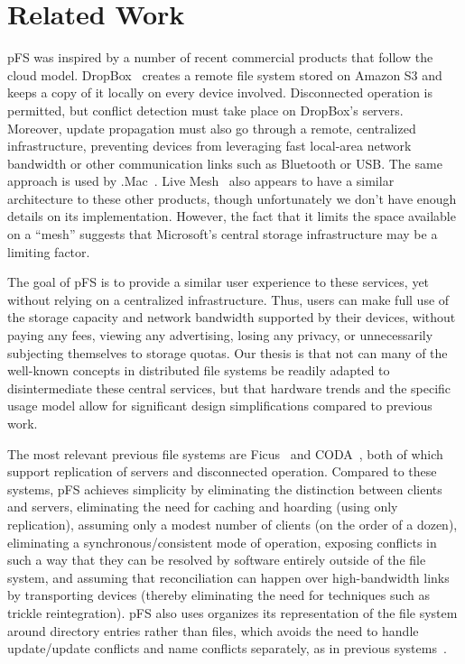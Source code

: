 
\section{Related Work}
\label{s:related}


pFS was inspired by a number of recent commercial products that follow
the cloud model.  DropBox~\cite{houston:dropbox} creates a remote file
system stored on Amazon S3 and keeps a copy of it locally on every
device involved.  Disconnected operation is permitted, but conflict
detection must take place on DropBox's servers.  Moreover, update
propagation must also go through a remote, centralized infrastructure,
preventing devices from leveraging fast local-area network bandwidth
or other communication links such as Bluetooth or USB\@.  The same
approach is used by .Mac~\cite{apple:mac}.  Live
Mesh~\cite{microsoft:livemesh} also appears to have a similar
architecture to these other products, though unfortunately we don't
have enough details on its implementation.  However, the fact that it
limits the space available on a ``mesh'' suggests that Microsoft's
central storage infrastructure may be a limiting factor.

The goal of pFS is to provide a similar user experience to these
services, yet without relying on a centralized infrastructure.  Thus,
users can make full use of the storage capacity and network bandwidth
supported by their devices, without paying any fees, viewing any
advertising, losing any privacy, or unnecessarily subjecting
themselves to storage quotas.  Our thesis is that not can many of the
well-known concepts in distributed file systems be readily adapted to
disintermediate these central services, but that hardware trends and
the specific usage model allow for significant design simplifications
compared to previous work.

The most relevant previous file systems are Ficus~\cite{page:ficus}
and CODA~\cite{kistler:coda}, both of which support replication of
servers and disconnected operation.  Compared to these systems, pFS
achieves simplicity by eliminating the distinction between clients and
servers, eliminating the need for caching and hoarding (using only
replication), assuming only a modest number of clients (on the order
of a dozen), eliminating a synchronous/consistent mode of operation,
exposing conflicts in such a way that they can be resolved by software
entirely outside of the file system, and assuming that reconciliation
can happen over high-bandwidth links by transporting devices (thereby
eliminating the need for techniques such as trickle reintegration).
pFS also uses organizes its representation of the file system around
directory entries rather than files, which avoids the need to handle
update/update conflicts and name conflicts separately, as in previous
systems~\cite{reiher:resolving}.

